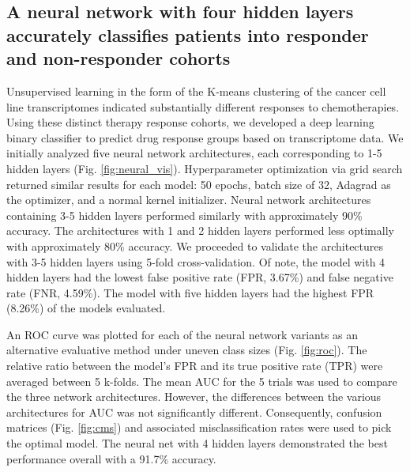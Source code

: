 \documentclass[10pt, letterpaper]{article}
\begin{document}
\begin{multicols*}{2}
\subsection*{A neural network with four hidden layers accurately classifies patients into responder and non-responder cohorts}
Unsupervised learning in the form of the K-means clustering of the cancer cell line transcriptomes indicated substantially different responses to chemotherapies. Using these distinct therapy response cohorts, we developed a deep learning binary classifier to predict drug response groups based on transcriptome data. We initially analyzed five neural network architectures, each corresponding to 1-5 hidden layers (Fig. \ref{fig:neural_vis}). Hyperparameter optimization via grid search returned similar results for each model: 50 epochs, batch size of 32, Adagrad as the optimizer, and a normal kernel initializer. Neural network architectures containing 3-5 hidden layers performed similarly with approximately 90\% accuracy. The architectures with 1 and 2 hidden layers performed less optimally with approximately 80\% accuracy. We proceeded to validate the architectures with 3-5 hidden layers using 5-fold cross-validation. Of note, the model with 4 hidden layers had the lowest false positive rate (FPR, 3.67\%) and false negative rate (FNR, 4.59\%). The model with five hidden layers had the highest FPR (8.26\%) of the models evaluated.

An ROC curve was plotted for each of the neural network variants as an alternative evaluative method under uneven class sizes (Fig. \ref{fig:roc}). The relative ratio between the model’s FPR and its true positive rate (TPR) were averaged between 5 k-folds. The mean AUC for the 5 trials was used to compare the three network architectures. However, the differences between the various architectures for AUC was not significantly different. Consequently, confusion matrices (Fig. \ref{fig:cms}) and associated misclassification rates were used to pick the optimal model. The neural net with 4 hidden layers demonstrated the best performance overall with a 91.7\% accuracy.



\end{multicols*}
\end{document}
